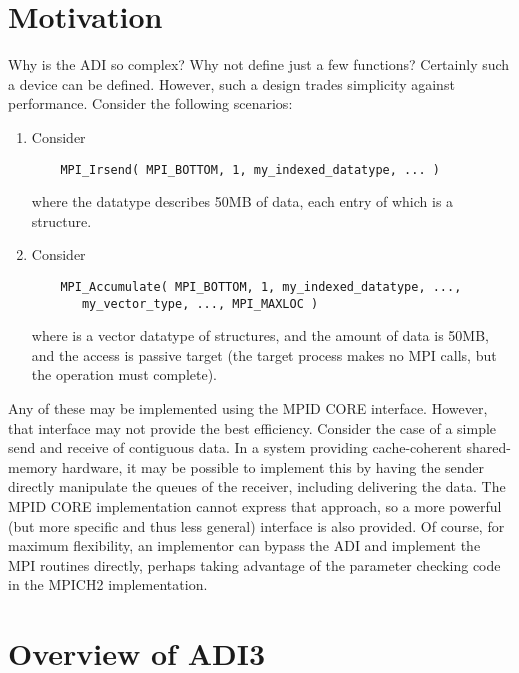 \documentclass{article}
\begin{document}


\section{Motivation}
\label{sec:motivation}

Why is the ADI so complex?  Why not define just a few functions?
Certainly such a device can be defined.  However, such a design trades
simplicity against performance.  
Consider the following scenarios:
\begin{enumerate}
\item Consider
\begin{verbatim}
    MPI_Irsend( MPI_BOTTOM, 1, my_indexed_datatype, ... )
\end{verbatim}
where the datatype describes 50MB of data, each entry of which is a
structure.
\item Consider
\begin{verbatim}
    MPI_Accumulate( MPI_BOTTOM, 1, my_indexed_datatype, ..., 
       my_vector_type, ..., MPI_MAXLOC )
\end{verbatim}
where  is
a vector datatype of structures, and the amount of data is 50MB, and
the access is passive target (the target process makes no MPI calls,
but the operation must complete).
\end{enumerate}

Any of these may be implemented using the MPID CORE interface.
However, that interface may not provide the best efficiency.  Consider
the case of a simple send and receive of contiguous data.  In a system
providing cache-coherent shared-memory hardware, it may be possible to
implement this by having the sender directly manipulate the queues of
the receiver, including delivering the data.  The MPID CORE
implementation cannot express that approach, so a more powerful (but
more specific and thus less general) interface is also provided.  Of
course, for maximum flexibility, an implementor can bypass the ADI and
implement the MPI routines directly, perhaps taking advantage of the
parameter checking code in the MPICH2 implementation.

\mancontentstrue

\section{Overview of ADI3}


\end{document}
